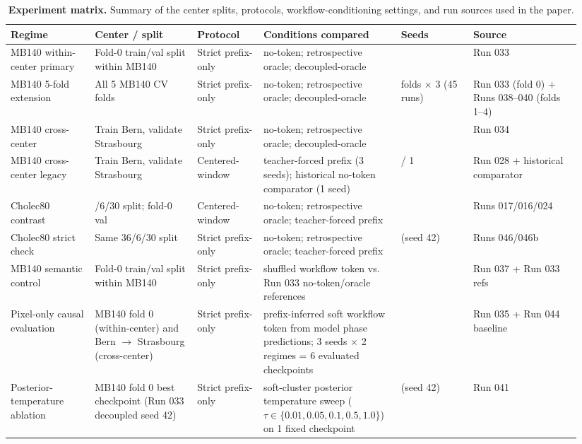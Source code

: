 \begin{table}[t]
\centering
\scriptsize
\setlength{\tabcolsep}{2pt}
\caption{\textbf{Experiment matrix.} Summary of the center splits,
protocols, workflow-conditioning settings, and run sources used in the
paper.}
\label{tab:experiment-matrix}
\begin{tabular}{@{}>{\raggedright\arraybackslash}p{0.14\linewidth}>{\raggedright\arraybackslash}p{0.17\linewidth}>{\raggedright\arraybackslash}p{0.11\linewidth}>{\raggedright\arraybackslash}p{0.22\linewidth}>{\raggedright\arraybackslash}p{0.12\linewidth}>{\raggedright\arraybackslash}p{0.18\linewidth}@{}}
\toprule
Regime & Center / split & Protocol & Conditions compared & Seeds & Source \\
\midrule
MB140 within-center primary & Fold-0 train/val split within MB140 & Strict prefix-only & no-token; retrospective oracle; decoupled-oracle & 3 & Run 033 \\
MB140 5-fold extension & All 5 MB140 CV folds & Strict prefix-only & no-token; retrospective oracle; decoupled-oracle & 5 folds $\times$ 3 (45 runs) & Run 033 (fold 0) + Runs 038--040 (folds 1--4) \\
MB140 cross-center & Train Bern, validate Strasbourg & Strict prefix-only & no-token; retrospective oracle; decoupled-oracle & 3 & Run 034 \\
MB140 cross-center legacy & Train Bern, validate Strasbourg & Centered-window & teacher-forced prefix (3 seeds); historical no-token comparator (1 seed) & 3 / 1 & Run 028 + historical comparator \\
Cholec80 contrast & 36/6/30 split; fold-0 val & Centered-window & no-token; retrospective oracle; teacher-forced prefix & 3 & Runs 017/016/024 \\
Cholec80 strict check & Same 36/6/30 split & Strict prefix-only & no-token; retrospective oracle; teacher-forced prefix & 1 (seed 42) & Runs 046/046b \\
MB140 semantic control & Fold-0 train/val split within MB140 & Strict prefix-only & shuffled workflow token vs. Run 033 no-token/oracle references & 3 & Run 037 + Run 033 refs \\
Pixel-only causal evaluation & MB140 fold 0 (within-center) and Bern $\rightarrow$ Strasbourg (cross-center) & Strict prefix-only & prefix-inferred soft workflow token from model phase predictions; 3 seeds $\times$ 2 regimes = 6 evaluated checkpoints & 3 & Run 035 + Run 044 baseline \\
Posterior-temperature ablation & MB140 fold 0 best checkpoint (Run 033 decoupled seed 42) & Strict prefix-only & soft-cluster posterior temperature sweep ($\tau \in \{0.01, 0.05, 0.1, 0.5, 1.0\}$) on 1 fixed checkpoint & 1 (seed 42) & Run 041 \\
\bottomrule
\end{tabular}
\end{table}

